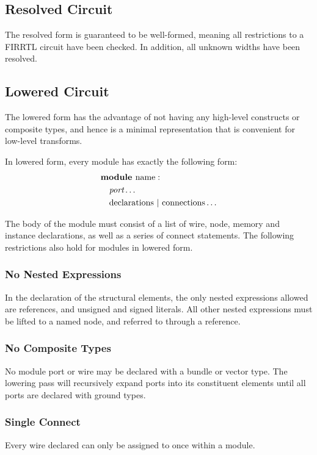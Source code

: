 \documentclass[10pt]{article}
\begin{document}
\subsection{Resolved Circuit}

The resolved form is guaranteed to be well-formed, meaning all restrictions to a FIRRTL circuit have been checked. In addition, all unknown widths have been resolved.

\subsection{Lowered Circuit}

The lowered form has the advantage of not having any high-level constructs or composite types, and hence is a minimal representation that is convenient for low-level transforms. 

In lowered form, every module has exactly the following form:
\[
\begin{aligned}
&\text{\bf module\ } \text{name} :                                 \\
&\quad \text{\em port} \ldots                                   \\
&\quad \text{declarations} \  \vert \  \text{connections} \ldots   \\
\end{aligned}
\]

The body of the module must consist of a list of wire, node, memory and instance declarations, as well as a series of connect statements.
The following restrictions also hold for modules in lowered form.

\subsubsection{No Nested Expressions}
In the declaration of the structural elements, the only nested expressions allowed are references, and unsigned and signed literals.
All other nested expressions must be lifted to a named node, and referred to through a reference. 

\subsubsection{No Composite Types}
No module port or wire may be declared with a bundle or vector type.
The lowering pass will recursively expand ports into its constituent elements until all ports are declared with ground types.

\subsubsection{Single Connect}
Every wire declared can only be assigned to once within a module.
\end{document}
